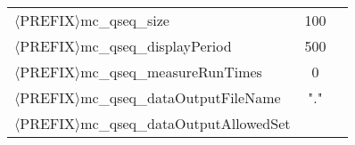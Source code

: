 \begin{table}[htpb]
\begin{center}
\begin{tabular}{l c  m{6cm}}
$\langle$PREFIX$\rangle$mc\_qseq\_size                   &   100   &             \\ %
$\langle$PREFIX$\rangle$mc\_qseq\_displayPeriod          &  500    &             \\ %
$\langle$PREFIX$\rangle$mc\_qseq\_measureRunTimes        &    0    &             \\ %
$\langle$PREFIX$\rangle$mc\_qseq\_dataOutputFileName     &   "."   &             \\ %
$\langle$PREFIX$\rangle$mc\_qseq\_dataOutputAllowedSet   &         &             \\ %
\bottomrule
\end{tabular}
\end{center}
\end{table}
% 
% 
% 
